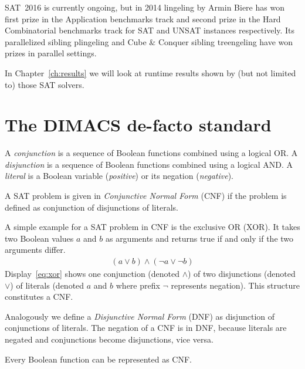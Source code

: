 SAT~2016 is currently ongoing, but in 2014 lingeling by Armin Biere has won first prize in
the Application benchmarks track and second prize in the Hard Combinatorial benchmarks
track for SAT and UNSAT instances respectively. Its parallelized sibling plingeling
and Cube \& Conquer sibling treengeling have won prizes in parallel settings.

In Chapter~\ref{ch:results} we will look at runtime results shown by (but not limited to)
those SAT solvers.

\section{The DIMACS de-facto standard}
\label{sec:sat-dimacs}
%
\begin{defi}
  A \emph{conjunction} is a sequence of Boolean functions combined using
  a logical OR. A \emph{disjunction} is a sequence of Boolean functions
  combined using a logical AND. A \emph{literal} is a Boolean variable
  (\emph{positive}) or its negation (\emph{negative}).

  A SAT problem is given in \emph{Conjunctive Normal Form} (CNF) if
  the problem is defined as conjunction of disjunctions of literals.
\end{defi}

A simple example for a SAT problem in CNF is the exclusive OR (XOR).
It takes two Boolean values $a$ and $b$ as arguments and returns true
if and only if the two arguments differ.
{
\setlength{\abovedisplayskip}{5pt}
\setlength{\belowdisplayskip}{5pt}
\setlength{\abovedisplayshortskip}{0pt}
\setlength{\belowdisplayshortskip}{0pt}
\begin{align} (a \lor b) \land (\neg a \lor \neg b) \label{eq:xor}\end{align}
}
Display~\ref{eq:xor} shows one conjunction (denoted $\land$) of two disjunctions
(denoted $\lor$) of literals (denoted $a$ and $b$ where prefix $\neg$ represents
negation). This structure constitutes a CNF.

Analogously we define a \emph{Disjunctive Normal Form} (DNF) as disjunction
of conjunctions of literals. The negation of a CNF is in DNF, because literals
are negated and conjunctions become disjunctions, vice versa.

\begin{theorem}
  \label{thm:all-cnf}
  Every Boolean function can be represented as CNF.
\end{theorem}

